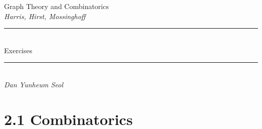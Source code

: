 \documentclass{article}
\begin{document}
\hspace*{\fill}
\begin{titlepage}
	\centering
	\vspace*{100pt}
		{\Large Graph Theory and Combinatorics}\\[0.5\baselineskip]
		{\Large \emph{Harris, Hirst, Mossinghoff}}\\[0.5\baselineskip]
	\vspace{0.03\textheight}
	\rule{0.3\textwidth}{0.4pt}\\[0.5\baselineskip]
	\vspace{0.05\textheight}	
		{\Huge Exercises}\\[0.5\baselineskip]
	\vspace{0.03\textheight}
	\rule{0.3\textwidth}{0.4pt}\\[0.5\baselineskip]
	\vspace{0.05\textheight}
		{\Large \emph{Dan Yunheum Seol}}\\[0.7\baselineskip]
	\begin{minipage}{6.7cm}
	\centering
	\end{minipage}
\end{titlepage}

\newpage
\section{2.1 Combinatorics}
\end{document}
